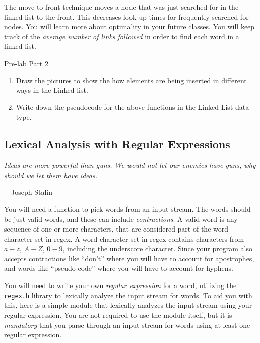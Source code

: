 \documentclass{article}
\begin{document}
The move-to-front technique moves a node that was just searched for in the
linked list to the front. This decreases look-up times for
frequently-searched-for nodes. You will learn more about optimality in your
future classes. You will keep track of the \emph{average number of links
followed} in order to find each word in a linked list.

\medskip
\begin{prelab}{Pre-lab Part 2}
  \begin{enumerate}
    \item Draw the pictures to show the how elements are being inserted in different ways in the Linked list.
    \item Write down the pseudocode for the above functions in the Linked List
        data type.
  \end{enumerate}
\end{prelab}


\subsection{Lexical Analysis with Regular Expressions}
\epigraph{\emph{Ideas are more powerful than guns. We would not let our enemies
have guns, why should we let them have ideas.}}{---Joseph Stalin}

\noindent
You will need a function to pick words from an input stream. The words should be
just valid words, and these can include \emph{contractions}. A valid word is any
sequence of one or more characters, that are considered part of the word
character set in regex. A word character set in regex contains characters from
$a-z$, $A-Z$, $0-9$, including the underscore character. Since your program also
accepts contractions like ``don't'' where you will have to account for apostrophes, and words like
``pseudo-code'' where you will have to account for hyphens.

You will need to write your own \emph{regular expression} for a word, utilizing
the \texttt{regex.h} library to lexically analyze the input stream for words. To
aid you with this, here is a simple module that lexically analyzes the input
stream using your regular expression. You are not required to use the module
itself, but it is \emph{mandatory} that you parse through an input stream for
words using at least one regular expression.
\end{document}
